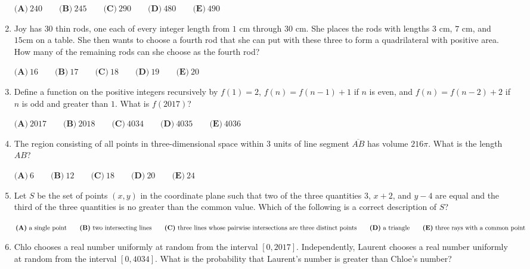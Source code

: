 \documentclass{article}
\begin{document}
\begin{enumerate}[label=\arabic*., itemsep=0.5em]
\(\textbf{(A)}\ 240\qquad\textbf{(B)}\ 245\qquad\textbf{(C)}\ 290\qquad\textbf{(D)}\ 480\qquad\textbf{(E)}\ 490\)\par \vspace{0.5em}\item Joy has \(30\) thin rods, one each of every integer length from \(1 \text{ cm}\) through \(30 \text{ cm}\). She places the rods with lengths \(3 \text{ cm}\), \(7 \text{ cm}\), and \(15 \text{cm}\) on a table. She then wants to choose a fourth rod that she can put with these three to form a quadrilateral with positive area. How many of the remaining rods can she choose as the fourth rod?

\(\textbf{(A)}\ 16 \qquad\textbf{(B)}\ 17 \qquad\textbf{(C)}\ 18 \qquad\textbf{(D)}\ 19  \qquad\textbf{(E)}\ 20\)\par \vspace{0.5em}\item Define a function on the positive integers recursively by \(f(1) = 2\), \(f(n) = f(n-1) + 1\) if \(n\) is even, and \(f(n) = f(n-2) + 2\) if \(n\) is odd and greater than \(1\). What is \(f(2017)\)?

\( \textbf{(A)}\ 2017 \qquad\textbf{(B)}\ 2018 \qquad\textbf{(C)}\ 4034 \qquad\textbf{(D)}\ 4035 \qquad\textbf{(E)}\ 4036\)\par \vspace{0.5em}\item The region consisting of all points in three-dimensional space within \(3\) units of line segment \(\overline{AB}\) has volume \(216 \pi\). What is the length \(AB\)?

\( \textbf{(A)}\ 6 \qquad\textbf{(B)}\ 12 \qquad\textbf{(C)}\ 18 \qquad\textbf{(D)}\ 20 \qquad\textbf{(E)}\ 24\)\par \vspace{0.5em}\item Let \(S\) be the set of points \((x,y)\) in the coordinate plane such that two of the three quantities \(3\), \(x+2\), and \(y-4\) are equal and the third of the three quantities is no greater than the common value. Which of the following is a correct description of \(S\)?

\( \textbf{(A)}\ \text{a single point} \qquad\textbf{(B)}\ \text{two intersecting lines} \\ \qquad\textbf{(C)}\ \text{three lines whose pairwise intersections are three distinct points} \\ \qquad\textbf{(D)}\ \text{a triangle}\qquad\textbf{(E)}\ \text{three rays with a common point} \)\par \vspace{0.5em}\item Chlo chooses a real number uniformly at random from the interval \( [ 0,2017 ]\). Independently, Laurent chooses a real number uniformly at random from the interval \([ 0 , 4034 ]\). What is the probability that Laurent's number is greater than Chloe's number?  


\end{enumerate}
\end{document}
